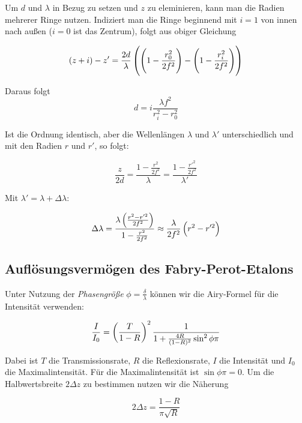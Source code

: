 \documentclass[a4paper,german,12pt,smallheadings]{scrartcl}
\begin{document}
Um $d$ und $\lambda$ in Bezug zu setzen und $z$ zu eleminieren, kann man die
Radien mehrerer Ringe nutzen. Indiziert man die Ringe beginnend mit $i = 1$ von
innen nach außen ($i = 0$ ist das Zentrum), folgt aus obiger Gleichung

\begin{equation}
  (z+i) - z' = \frac{2d}{\lambda} \del{\del{1-\frac{r_0^2}{2f^2}} - \del{1-\frac{r_i^2}{2f^2}}}
\end{equation}

Daraus folgt
\begin{equation}
  d = i \frac{\lambda f^2}{r_i^2 - r_0^2}
  \label{eq:deq}
\end{equation}

Ist die Ordnung identisch, aber die Wellenlängen $\lambda$ und $\lambda'$
unterschiedlich und mit den Radien $r$ und $r'$, so folgt:

\begin{equation}
  \frac{z}{2d} = \frac{1 - \frac{r^2}{2f^2}}{\lambda} = \frac{1 - \frac{r'^2}{2f^2}}{\lambda'}
\end{equation}

Mit $\lambda' = \lambda + \Delta \lambda$:

\begin{equation}
  \Delta \lambda = \frac{\lambda \del{\frac{r^2 - r'^2}{2f^2}}}{1 - \frac{r^2}{2f^2}} \approx \frac{\lambda}{2f^2} \del{r^2 - r'^2}
\end{equation}

\subsection{Auflösungsvermögen des Fabry-Perot-Etalons}

Unter Nutzung der \textit{Phasengröße} $\phi = \frac{\delta}{\lambda}$ können
wir die Airy-Formel für die Intensität verwenden:

\begin{equation}
  \frac{I}{I_0} = \del{\frac{T}{1-R}}^2 \frac{1}{1+\frac{4R}{(1-R)^2} \sin^2 \phi \pi}
\end{equation}

Dabei ist $T$ die Transmissionsrate, $R$ die Reflexionsrate, $I$ die Intensität
und $I_0$ die Maximalintensität. Für die Maximalintensität ist $\sin \phi \pi =
0$. Um die Halbwertsbreite $2 \Delta z$ zu bestimmen nutzen wir die Näherung

\begin{equation}
  2 \Delta z = \frac{1-R}{\pi \sqrt{R}}
\end{equation}
\end{document}
